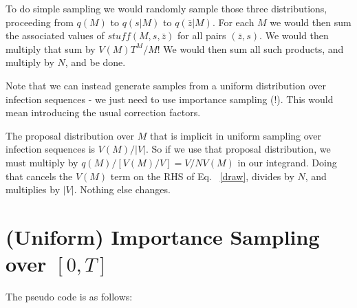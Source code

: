 \documentclass{article}
\begin{document}
        To do simple sampling we would randomly sample those three distributions,
        proceeding from $q(M)$ to $q(s | M)$ to $q(\bar{z} | M)$. For each $M$ we would
        then sum the associated values of $stuff(M, s, \bar{z})$ for all pairs $(\bar{z}, s)$.
        We would then multiply that sum by $V(M)T^M / M!$
        We would then sum all such products, and multiply by $N$, and be done.

        Note that we can instead generate samples from a uniform distribution over
        infection sequences   -  we just need to use importance sampling (!). This would mean
        introducing the usual correction factors.
 
        The proposal distribution over $M$ that is implicit in uniform sampling over infection sequences is
        $V(M) / |V|$. So if we use that proposal distribution, we must multiply by
        $q(M) / [V(M) / V] = V / NV(M)$ in our integrand. Doing that cancels the $V(M)$
        term on the RHS of Eq. ~\ref{draw}, divides by $N$, and multiplies by $|V|$. Nothing else changes.


\pagebreak

\section{(Uniform) Importance Sampling over $[0, T]$ }

The pseudo code is as follows:
\end{document}
